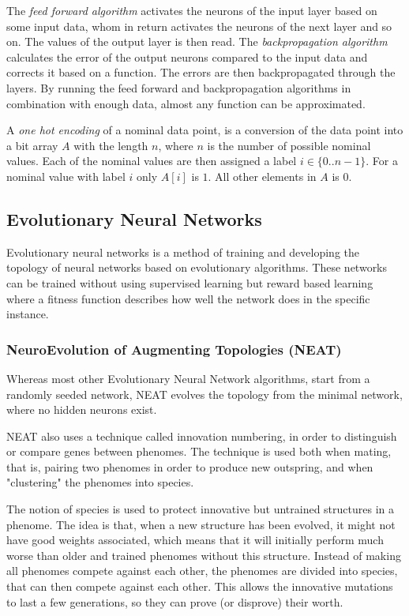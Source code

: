 \documentclass{article}
\newcommand{\newpar}{\bigskip\noindent}
\begin{document}
\newpar The \textit{feed forward algorithm} activates the neurons of the input layer based on some input data, whom in return activates the neurons of the next layer and so on. The values of the output layer is then read. The \textit{backpropagation algorithm} calculates the error of the output neurons compared to the input data and corrects it based on a function. The errors are then backpropagated through the layers. By running the feed forward and backpropagation algorithms in combination with enough data, almost any function can be approximated.

\newpar A \textit{one hot encoding} of a nominal data point, is a conversion of the data point into a bit array $A$ with the length $n$, where $n$ is the number of possible nominal values. Each of the nominal values are then assigned a label $i \in \{0 .. n-1\}$. For a nominal value with label $i$ only $ A[i] $ is $1$. All other elements in $A$ is $0$.

\subsection{Evolutionary Neural Networks}
Evolutionary neural networks is a method of training and developing the topology of neural networks based on evolutionary algorithms. These networks can be trained without using supervised learning but reward based learning where a fitness function describes how well the network does in the specific instance. 

\subsubsection{NeuroEvolution of Augmenting Topologies (NEAT)}
Whereas most other Evolutionary Neural Network algorithms, start from a randomly seeded network, NEAT evolves the topology from the minimal network, where no hidden neurons exist.

\newpar NEAT also uses a technique called innovation numbering, in order to distinguish or compare genes between phenomes. The technique is used both when mating, that is, pairing two phenomes in order to produce new outspring, and when "clustering" the phenomes into species.

\newpar The notion of species is used to protect innovative but untrained structures in a phenome. The idea is that, when a new structure has been evolved, it might not have good weights associated, which means that it will initially perform much worse than older and trained phenomes without this structure. Instead of making all phenomes compete against each other, the phenomes are divided into species, that can then compete against each other. This allows the innovative mutations to last a few generations, so they can prove (or disprove) their worth.
\end{document}
